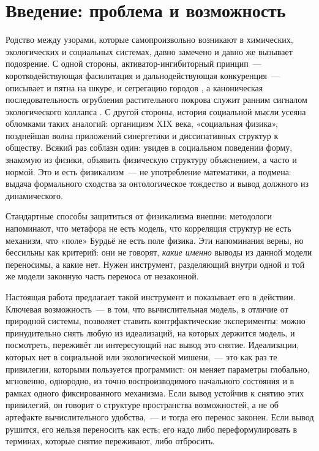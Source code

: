 \documentclass[11pt]{article}
\begin{document}
\section{Введение: проблема и возможность}
Родство между узорами, которые самопроизвольно возникают в химических, экологических и социальных системах,
давно замечено и давно же вызывает подозрение. С одной стороны, активатор-ингибиторный принцип~— короткодействующая
фасилитация и дальнодействующая конкуренция~— описывает и пятна на шкуре, и сегрегацию городов
\cite{turing1952,krugman1996}, а каноническая последовательность огрубления растительного покрова служит ранним
сигналом экологического коллапса \cite{rietkerk2004,meron2015}. С другой стороны, история социальной мысли
усеяна обломками таких аналогий: органицизм XIX века, «социальная физика», позднейшая волна приложений синергетики
и диссипативных структур к обществу. Всякий раз соблазн один: увидев в социальном поведении форму, знакомую из
физики, объявить физическую структуру объяснением, а часто и нормой. Это и есть физикализм~— не употребление
математики, а подмена: выдача формального сходства за онтологическое тождество и вывод должного из динамического.

Стандартные способы защититься от физикализма внешни: методологи напоминают, что метафора не есть модель, что
корреляция структур не есть механизм, что «поле» Бурдьё \cite{bourdieu1992} не есть поле физика. Эти напоминания
верны, но бессильны как критерий: они не говорят, \emph{какие именно} выводы из данной модели переносимы, а какие
нет. Нужен инструмент, разделяющий внутри одной и той же модели законную часть переноса от незаконной.

Настоящая работа предлагает такой инструмент и показывает его в действии. Ключевая возможность~— в том, что
вычислительная модель, в отличие от природной системы, позволяет ставить контрфактические эксперименты: можно
принудительно снять любую из идеализаций, на которых держится модель, и посмотреть, переживёт ли интересующий нас
вывод это снятие. Идеализации, которых нет в социальной или экологической мишени,~— это как раз те привилегии,
которыми пользуется программист: он меняет параметры глобально, мгновенно, однородно, из точно воспроизводимого
начального состояния и в рамках одного фиксированного механизма. Если вывод устойчив к снятию этих привилегий,
он говорит о структуре пространства возможностей, а не об артефакте вычислительного удобства,~— и тогда его
перенос законен. Если вывод рушится, его нельзя переносить как есть; его надо либо переформулировать в терминах,
которые снятие переживают, либо отбросить.
\end{document}
